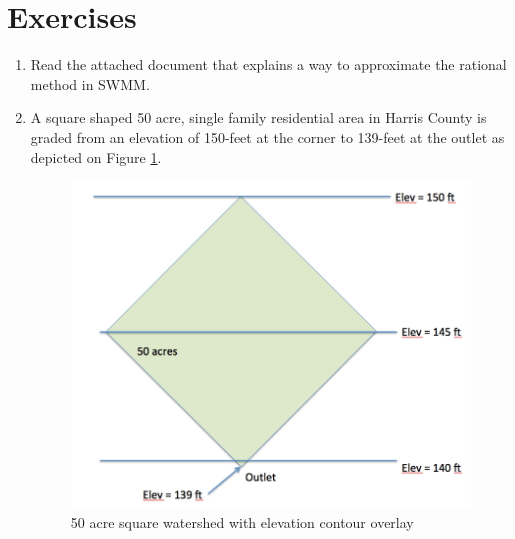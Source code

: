 \documentclass[12pt]{article}
\begin{document}
\section*{\small{Exercises}}
\begin{enumerate}
\item Read the attached document that explains a way to approximate the rational method in SWMM.   
\item A square shaped 50 acre, single family residential area in Harris County is graded from an elevation of 150-feet at the corner to 139-feet at the outlet as depicted on Figure \ref{fig:watershed.jpg}.

\begin{figure}[h!] %
   \centering
   \includegraphics[width=5in]{watershed.jpg} 
   \caption{50 acre square watershed with elevation contour overlay}
   \label{fig:watershed.jpg}
\end{figure} 
\clearpage


\end{enumerate}
\end{document}
